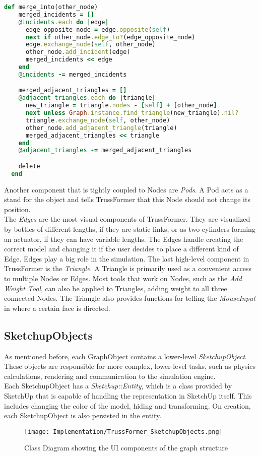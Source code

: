 \clearpage
\begin{lstlisting}[language=Ruby, label={lst:merging_code}, caption=Merging of two Nodes]
  def merge_into(other_node)
    merged_incidents = []
    @incidents.each do |edge|
      edge_opposite_node = edge.opposite(self)
      next if other_node.edge_to?(edge_opposite_node)
      edge.exchange_node(self, other_node)
      other_node.add_incident(edge)
      merged_incidents << edge
    end
    @incidents -= merged_incidents

    merged_adjacent_triangles = []
    @adjacent_triangles.each do |triangle|
      new_triangle = triangle.nodes - [self] + [other_node]
      next unless Graph.instance.find_triangle(new_triangle).nil?
      triangle.exchange_node(self, other_node)
      other_node.add_adjacent_triangle(triangle)
      merged_adjacent_triangles << triangle
    end
    @adjacent_triangles -= merged_adjacent_triangles

    delete
  end
\end{lstlisting}
Another component that is tightly coupled to Nodes are \textit{Pods}. A Pod acts as a stand for the object and tells TrussFormer that this Node should not change its position.\\
The \textit{Edges} are the most visual components of TrussFormer. They are visualized by bottles of different lengths, if they are static links, or as two cylinders forming an actuator, if they can have variable lengths. The Edges handle creating the correct model and changing it if the user decides to place a different kind of Edge. Edges play a big role in the simulation.
The last high-level component in TrussFormer is the \textit{Triangle}. A Triangle is primarily used as a convenient access to multiple Nodes or Edges. Most tools that work on Nodes, such as the \textit{Add Weight Tool}, can also be applied to Triangles, adding weight to all three connected Nodes. The Triangle also provides functions for telling the \textit{MouseInput} in where a certain face is directed.

\subsection{SketchupObjects}
As mentioned before, each GraphObject contains a lower-level \textit{SketchupObject}. These objects are responsible for more complex, lower-level tasks, such as physics calculations, rendering and communication to the simulation engine.\\
Each SketchupObject has a \textit{Sketchup::Entity}, which is a class provided by SketchUp that is capable of handling the representation in SketchUp itself. This includes changing the color of the model, hiding and transforming. On creation, each SketchupObject is also persisted in the entity.
\begin{figure}[h!]
    \texttt{[image: Implementation/TrussFormer\_SketchupObjects.png]}
    \centering
    \caption{Class Diagram showing the UI components of the graph structure}
    \label{fig:sketchup_objects}
\end{figure}

